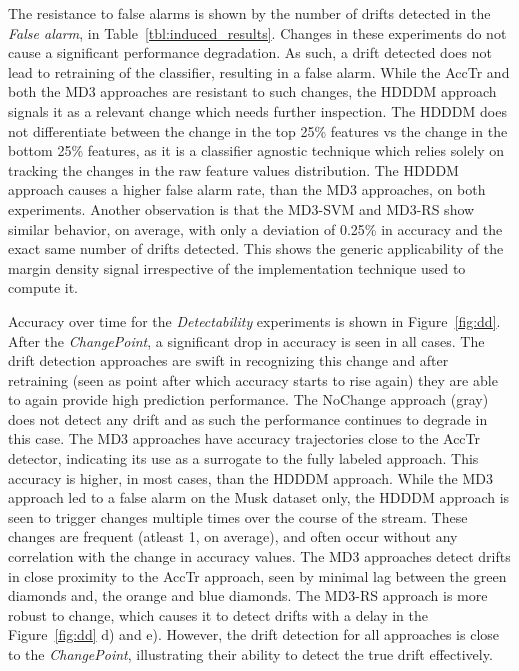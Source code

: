\documentclass[authoryear,3p,times,twocolumn]{elsarticle}
\begin{document}
The resistance to false alarms is shown by the number of drifts detected in the \textit{False alarm}, in Table~\ref{tbl:induced_results}. Changes in these experiments do not cause a significant performance degradation. As such, a drift detected does not lead to retraining of the classifier, resulting in a false alarm. While the AccTr and both the MD3 approaches are resistant to such changes, the HDDDM approach signals it as a relevant change which needs further inspection. The HDDDM does not differentiate between the change in the top 25\% features vs the change in the bottom 25\% features, as it is a classifier agnostic technique which relies solely on tracking the changes in the raw feature values distribution. The HDDDM approach causes a higher false alarm rate, than the MD3 approaches, on both experiments. Another observation is that the MD3-SVM and MD3-RS show similar behavior, on average, with only a deviation of 0.25\% in accuracy and the exact same number of drifts detected. This shows the generic applicability of the margin density signal irrespective of the implementation technique used to compute it. 

Accuracy over time for the \textit{Detectability} experiments is shown in Figure~\ref{fig:dd}. After the \textit{ChangePoint}, a significant drop in accuracy is seen in all cases. The drift detection approaches are swift in recognizing this change and after retraining (seen as point after which accuracy starts to rise again) they are able to again provide high prediction performance. The NoChange approach (gray) does not detect any drift and as such the performance continues to degrade in this case. The MD3 approaches have accuracy trajectories close to the AccTr detector, indicating its use as a surrogate to the fully labeled approach. This accuracy is higher, in most cases, than the HDDDM approach. While the MD3 approach led to a false alarm on the Musk dataset only, the HDDDM approach is seen to trigger changes multiple times over the course of the stream. These changes are frequent (atleast 1, on average), and often occur without any correlation with the change in accuracy values. The MD3 approaches detect drifts in close proximity to the AccTr approach, seen by minimal lag between the green diamonds and, the orange and blue diamonds. The MD3-RS approach is more robust to change, which causes it to detect drifts with a delay in the Figure~\ref{fig:dd} d) and e). However, the drift detection for all approaches is close to the \textit{ChangePoint}, illustrating their ability to detect the true drift effectively. 
\end{document}
